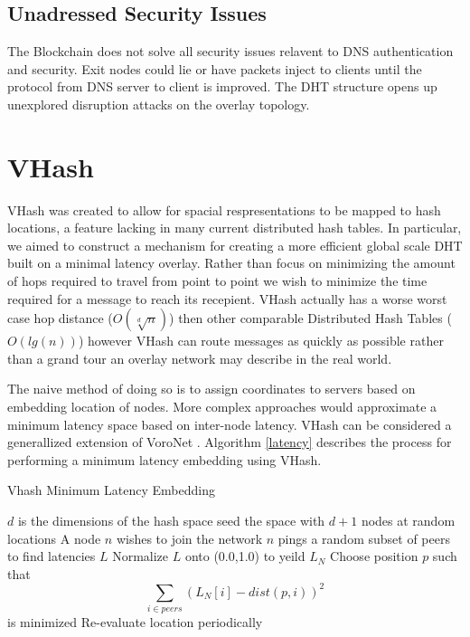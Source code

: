 \documentclass[11pt]{IEEEtran} %
\begin{document}
\subsection{Unadressed Security Issues}
The Blockchain does not solve all security issues relavent to DNS authentication and security. Exit nodes could lie or have packets inject to clients until the protocol from DNS server to client is improved. The DHT structure opens up unexplored disruption attacks on the overlay topology.



\section{VHash}
VHash was created to allow for spacial respresentations to be mapped to hash locations, a feature lacking in many current distributed hash tables.  In particular, we aimed to construct a mechanism for creating a more efficient global scale DHT built on a minimal latency overlay. Rather than focus on minimizing the amount of hops required to travel from point to point we wish to minimize the time required for a message to reach its recepient. VHash actually has a worse worst case hop distance ($O(\sqrt[d]{n})$) then other comparable Distributed Hash Tables ($O(lg(n))$) however VHash can route messages as quickly as possible rather than a grand tour an overlay network may describe in the real world.

The naive method of doing so is to assign coordinates to servers based on embedding location of nodes. More complex approaches would approximate a minimum latency space based on inter-node latency. VHash can be considered  a generallized extension of VoroNet \cite{voronet}.  Algorithm \ref{latency} describes the process for performing a minimum latency embedding using VHash.









\begin{algorithm}
\caption{Vhash Minimum Latency Embedding}
\label{latency}
\begin{algorithmic}[1]  %
	\STATE $d$ is the dimensions of the hash space
    \STATE seed the space with $d+1$ nodes at random locations
   	\STATE A node $n$ wishes to join the network
    \STATE $n$ pings a random subset of peers to find latencies $L$
    \STATE Normalize $L$ onto (0.0,1.0) to yeild $L_N$
    \STATE Choose position $p$ such that $$\sum\limits_{i\in peers}(L_N[i]-dist(p,i))^2$$ is minimized
    \STATE Re-evaluate location periodically
\end{algorithmic}
\end{algorithm}
\end{document}
